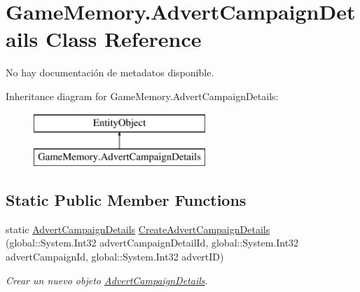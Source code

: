 \hypertarget{class_game_memory_1_1_advert_campaign_details}{\section{Game\-Memory.\-Advert\-Campaign\-Details Class Reference}
\label{class_game_memory_1_1_advert_campaign_details}
}


No hay documentación de metadatos disponible.  


Inheritance diagram for Game\-Memory.\-Advert\-Campaign\-Details\-:\begin{figure}[H]
\begin{center}
\leavevmode
\includegraphics[height=2.000000cm]{class_game_memory_1_1_advert_campaign_details}
\end{center}
\end{figure}
\subsection*{Static Public Member Functions}
\begin{DoxyCompactItemize}
\item 
static \hyperlink{class_game_memory_1_1_advert_campaign_details}{Advert\-Campaign\-Details} \hyperlink{class_game_memory_1_1_advert_campaign_details_ac69bee7e775bf7dcc7d5461189198b8b}{Create\-Advert\-Campaign\-Details} (global\-::\-System.\-Int32 advert\-Campaign\-Detail\-Id, global\-::\-System.\-Int32 advert\-Campaign\-Id, global\-::\-System.\-Int32 advert\-I\-D)
\begin{DoxyCompactList}\small\item\em Crear un nuevo objeto \hyperlink{class_game_memory_1_1_advert_campaign_details}{Advert\-Campaign\-Details}. \end{DoxyCompactList}\end{DoxyCompactItemize}
